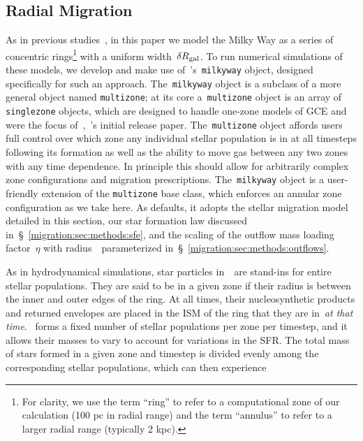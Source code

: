 \subsection{Radial Migration} 
\label{migration:sec:methods:migration} 
As in previous studies~\citep[e.g.][]{Matteucci1989, Schoenrich2009a, 
Minchev2013, Sharma2021}, in this paper we model the Milky Way as a series of 
concentric rings\footnote{
	For clarity, we use the term ``ring'' to refer to a computational zone of 
	our calculation (100 pc in radial range) and the term ``annulus'' to refer 
	to a larger radial range (typically 2 kpc). 
} with a uniform width~$\delta R_\text{gal}$. 
To run numerical simulations of these models, we develop and make use 
of~\vice's~\texttt{milkyway} object, designed specifically for such an 
approach. 
The~\texttt{milkyway} object is a subclass of a more general object named 
\texttt{multizone}; at its core a~\texttt{multizone} object is an array of 
\texttt{singlezone} objects, which are designed to handle one-zone models of 
GCE and were the focus of~\citet{Johnson2020},~\vice's initial release paper. 
The~\texttt{multizone} object affords users full control over which zone any 
individual stellar population is in at all timesteps following its formation as 
well as the ability to move gas between any two zones with any time dependence. 
In principle this should allow for arbitrarily complex zone configurations and 
migration prescriptions. 
The~\texttt{milkyway} object is a user-friendly extension of the 
\texttt{multizone} base class, which enforces an annular zone configuration as 
we take here. 
As defaults, it adopts the stellar migration model detailed in this section, 
our star formation law discussed in~\S~\ref{migration:sec:methods:sfe}, and the scaling 
of the outflow mass loading factor~$\eta$ with radius~\rgal~parameterized 
in~\S~\ref{migration:sec:methods:outflows}. 
\par 
As in hydrodynamical simulations, star particles in~\vice~are stand-ins for 
entire stellar populations. 
They are said to be in a given zone if their radius is between the inner and 
outer edges of the ring. 
At all times, their nucleosynthetic products and returned envelopes are placed 
in the ISM of the ring that they are in~\textit{at that time}. 
\vice~forms a fixed number of stellar populations per zone per timestep, and it 
allows their masses to vary to account for variations in the SFR. 
The total mass of stars formed in a given zone and timestep is divided evenly 
among the corresponding stellar populations, which can then experience 
